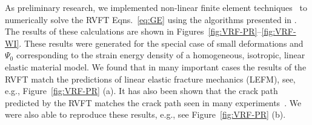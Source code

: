 \documentclass[10pt,letterpaper]{article}
\begin{document}




As preliminary research, we implemented non-linear finite element techniques~\cite{belytschko2013nonlinear} to
numerically solve the RVFT Eqns.~\eqref{eq:GE} using the algorithms presented in \cite{borden2012phase}. 
%
The results of these calculations are shown in Figures~\ref{fig:VRF-PR}--\ref{fig:VRF-WI}. 
%
These results were generated for the special case of small deformations and $\Psi_0$ corresponding to the strain energy density of a homogeneous, isotropic, linear elastic material model.
%
We found that in many important cases the results of the RVFT match the predictions of linear elastic fracture mechanics (LEFM), see, e.g.,  Figure~\ref{fig:VRF-PR} (a).
%
It has also been shown that the crack path predicted by the RVFT matches the crack path seen in many experiments~\cite{miehe2010phase,borden2012phase,dally2015phase}. 
%
We were also able to reproduce these results, e.g., see Figure~\ref{fig:VRF-PR} (b).
\end{document}
